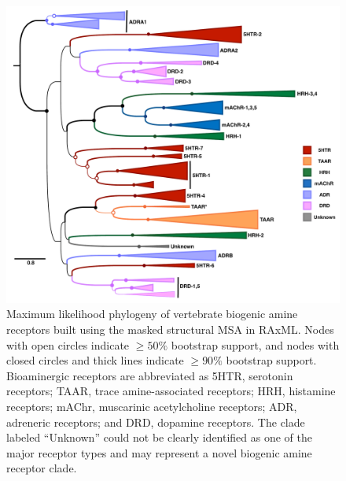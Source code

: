 \documentclass[fleqn,10pt]{wlpeerj}
\begin{document}
\newpage

\begin{figure}[htbp]
	\centerline{\includegraphics[width=18cm]{figures/masked_part_phylogeny.pdf}}
	\caption{\label{phylogeny} Maximum likelihood phylogeny of vertebrate biogenic amine receptors built using the masked structural MSA in RAxML. Nodes with open circles indicate $\geq 50\%$ bootstrap support, and nodes with closed circles and thick lines indicate $\geq 90\%$ bootstrap support. Bioaminergic receptors are abbreviated as 5HTR, serotonin receptors; TAAR, trace amine-associated receptors; HRH, histamine receptors; mAChr, muscarinic acetylcholine receptors; ADR, adreneric receptors; and DRD, dopamine receptors. The clade labeled ``Unknown'' could not be clearly identified as one of the major receptor types and may represent a novel biogenic amine receptor clade.}
\end{figure}


\newpage
\end{document}
